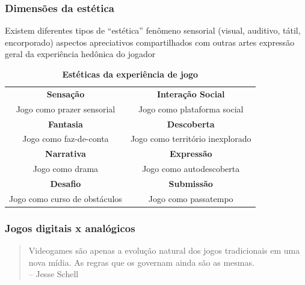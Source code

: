 \expandafter\documentclass\expandafter[table, usenames, svgnames, dvipsnames, \classopts]{beamer}
\begin{document}
\begin{frame}
	\frametitle{\textbf{Dimensões da estética}}

	\begin{outline}
		\1 Existem diferentes tipos de ``estética'' \cite{Niedenthal2009}
			\2[-] fenômeno sensorial (visual, auditivo, tátil, encorporado)
			\2[-] aspectos apreciativos compartilhados com outras artes
			\2[-] expressão geral da experiência hedônica do jogador
	\end{outline}

	\begin{table}
		\scriptsize
		\setlength{\tabcolsep}{1pt}
		\renewcommand{\arraystretch}{1}
		\caption{\textbf{Estéticas da experiência de jogo} \cite{Hunicke2004}}
		\begin{tabular}{cc}
			\toprule
			\textbf{Sensação} & \textbf{Interação Social}\\
			Jogo como prazer sensorial & Jogo como plataforma social\\[1em]
			\textbf{Fantasia} & \textbf{Descoberta}\\
			Jogo como faz-de-conta & Jogo como território inexplorado\\[1em]
			\textbf{Narrativa} & \textbf{Expressão}\\
			Jogo como drama & Jogo como autodescoberta\\[1em]
			\textbf{Desafio} & \textbf{Submissão}\\
			Jogo como curso de obstáculos & Jogo como passatempo\\
			\bottomrule
		\end{tabular}
	\end{table}
	
\end{frame}

\begin{frame}
	\frametitle{\textbf{Jogos digitais x analógicos}}
	
	\begin{quotation}
		\noindent
		{\large Videogames são apenas a evolução natural dos jogos tradicionais em uma nova mídia. As regras que os governam ainda são as mesmas.\\[0.5em]
		\noindent
		\hfill-- Jesse Schell}
	\end{quotation}

\end{frame}
\end{document}
